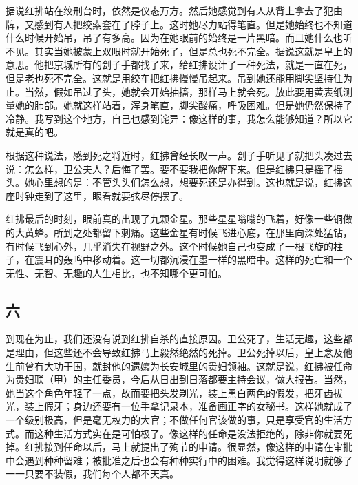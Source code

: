 据说红拂站在绞刑台时，依然是仪态万方。然后她感觉到有人从背上拿去了犯由牌，又感到有人把绞索套在了脖子上。这时她尽力站得笔直。但是她始终也不知道什么时候开始吊，吊了有多高。因为在她眼前的始终是一片黑暗。而且她什么也听不见。其实当她被蒙上双眼时就开始死了，但是总也死不完全。据说这就是皇上的意思。他把京城所有的刽子手都找了来，给红拂设计了一种死法，就是一直在死，但是老也死不完全。这就是用绞车把红拂慢慢吊起来。吊到她还能用脚尖坚持住为止。当然，假如吊过了头，她就会开始抽搐，那样马上就会死。放此要用黄表纸测量她的肺部。她就这样站着，浑身笔直，脚尖酸痛，呼吸困难。但是她仍然保持了冷静。我写到这个地方，自己也感到诧异：像这样的事，我怎么能够知道？所以它就是真的吧。 

根据这种说法，感到死之将近时，红拂曾经长叹一声。刽子手听见了就把头凑过去说：怎么样，卫公夫人？后悔了罢。要不要我把你解下来。但是红拂只是摇了摇头。她心里想的是：不管头头们怎么想，想要死还是办得到。这也就是说，红拂这座时钟走到了这里，眼看就要弦尽停摆了。 

红拂最后的时刻，眼前真的出现了九颗金星。那些星星嗡嗡的飞着，好像一些铜做的大黄蜂。所到之处都留下刺痛。这些金星有时候飞进心底，在那里向深处猛钻，有时候飞到心外，几乎消失在视野之外。这个时候她自己也变成了一根飞旋的柱子，在震耳的轰鸣中移动着。这一切都沉浸在墨一样的黑暗中。这样的死亡和一个无性、无智、无趣的人生相比，也不知哪个更可怕。 

\subsection{六} 

到现在为止，我们还没有说到红拂自杀的直接原因。卫公死了，生活无趣，这些都是理由，但这些还不会导致红拂马上毅然绝然的死掉。卫公死掉以后，皇上念及他生前曾有大功于国，就封他的遗孀为长安城里的贵妇领袖。这就是说，红拂被任命为贵妇联（甲）的主任委员，今后从日出到日落都要主持会议，做大报告。当然，她当这个角色年轻了一点，故而要把头发剃光，装上黑白两色的假发，把牙齿拔光，装上假牙；身边还要有一位手拿记录本，准备画正字的女秘书。这样她就成了一个级别极高，但是毫无权力的大官；不做任何官该做的事，只是享受官的生活方式。而这种生活方式实在是可怕极了。像这样的任命是没法拒绝的，除非你就要死掉。红拂接到任命以后，马上就提出了殉节的申请。很显然，像这样的申请在审批中会遇到种种留难；被批准之后也会有种种实行中的困难。我觉得这样说明就够了一一只要不装假，我们每个人都不天真。 

